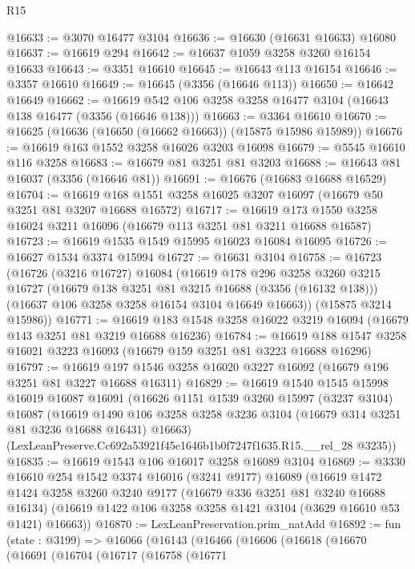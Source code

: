 \begin{lexlean}{R15}
\begin{coremodule}
@16633 := @3070 @16477 @3104
@16636 := @16630 (@16631 @16633) @16080
@16637 := @16619 @294
@16642 := @16637 @1059 @3258 @3260 @16154 @16633
@16643 := @3351 @16610
@16645 := @16643 @113 @16154
@16646 := @3357 @16610
@16649 := @16645 (@3356 (@16646 @113))
@16650 := @16642 @16649
@16662 := @16619 @542 @106 @3258 @3258 @16477 @3104 (@16643 @138 @16477 (@3356 (@16646 @138)))
@16663 := @3364 @16610
@16670 := @16625 (@16636 (@16650 (@16662 @16663)) (@15875 @15986 @15989))
@16676 := @16619 @163 @1552 @3258 @16026 @3203 @16098
@16679 := @5545 @16610 @116 @3258
@16683 := @16679 @81 @3251 @81 @3203
@16688 := @16643 @81 @16037 (@3356 (@16646 @81))
@16691 := @16676 (@16683 @16688 @16529)
@16704 := @16619 @168 @1551 @3258 @16025 @3207 @16097 (@16679 @50 @3251 @81 @3207 @16688 @16572)
@16717 := @16619 @173 @1550 @3258 @16024 @3211 @16096 (@16679 @113 @3251 @81 @3211 @16688 @16587)
@16723 := @16619 @1535 @1549 @15995 @16023 @16084 @16095
@16726 := @16627 @1534 @3374 @15994
@16727 := @16631 @3104
@16758 := @16723
    (@16726
      (@3216 @16727)
      @16084
      (@16619
        @178
        @296
        @3258
        @3260
        @3215
        @16727
        (@16679 @138 @3251 @81 @3215 @16688 (@3356 (@16132 @138)))
        (@16637 @106 @3258 @3258 @16154 @3104 @16649 @16663))
      (@15875 @3214 @15986))
@16771 := @16619 @183 @1548 @3258 @16022 @3219 @16094 (@16679 @143 @3251 @81 @3219 @16688 @16236)
@16784 := @16619 @188 @1547 @3258 @16021 @3223 @16093 (@16679 @159 @3251 @81 @3223 @16688 @16296)
@16797 := @16619 @197 @1546 @3258 @16020 @3227 @16092 (@16679 @196 @3251 @81 @3227 @16688 @16311)
@16829 := @16619
    @1540
    @1545
    @15998
    @16019
    @16087
    @16091
    (@16626
      @1151
      @1539
      @3260
      @15997
      (@3237 @3104)
      @16087
      (@16619 @1490 @106 @3258 @3258 @3236 @3104 (@16679 @314 @3251 @81 @3236 @16688 @16431) @16663)
      (LexLeanPreserve.Cc692a53921f45e1646b1b0f7247f1635.R15.__rel_28 @3235))
@16835 := @16619 @1543 @106 @16017 @3258 @16089 @3104
@16869 := @3330
    @16610
    @254
    @1542
    @3374
    @16016
    (@3241 @9177)
    @16089
    (@16619
      @1472
      @1424
      @3258
      @3260
      @3240
      @9177
      (@16679 @336 @3251 @81 @3240 @16688 @16134)
      (@16619 @1422 @106 @3258 @3258 @1421 @3104 (@3629 @16610 @53 @1421) @16663))
@16870 := LexLeanPreservation.prim_natAdd
@16892 := fun (state : @3199) =>
  @16066
    (@16143
      (@16466
        (@16606
          (@16618
            (@16670
              (@16691
                (@16704
                  (@16717
                    (@16758
                      (@16771

\end{coremodule}
\end{lexlean}
